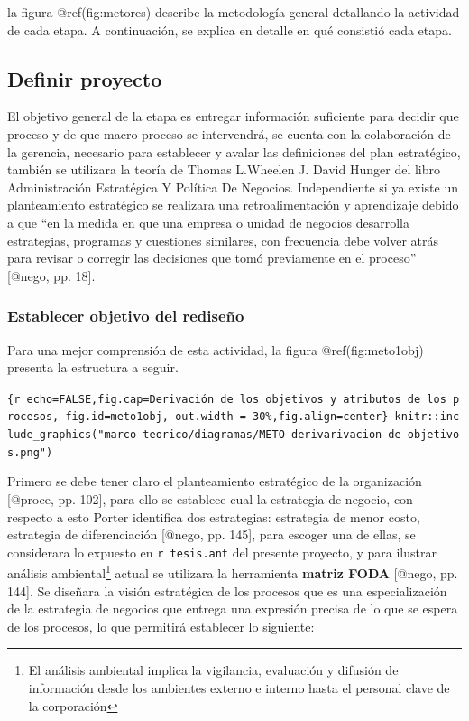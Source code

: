 \documentclass[11pt]{article}
\begin{document}
la figura @ref(fig:metores) describe la metodología general detallando
la actividad de cada etapa. A continuación, se explica en detalle en qué
consistió cada etapa.

\hypertarget{definir-proyecto}{%
\subsection{Definir proyecto}\label{definir-proyecto}}

El objetivo general de la etapa es entregar información suficiente para
decidir que proceso y de que macro proceso se intervendrá, se cuenta con
la colaboración de la gerencia, necesario para establecer y avalar las
definiciones del plan estratégico, también se utilizara la teoría de
Thomas L.Wheelen J. David Hunger del libro Administración Estratégica Y
Política De Negocios. Independiente si ya existe un planteamiento
estratégico se realizara una retroalimentación y aprendizaje debido a
que ``en la medida en que una empresa o unidad de negocios desarrolla
estrategias, programas y cuestiones similares, con frecuencia debe
volver atrás para revisar o corregir las decisiones que tomó previamente
en el proceso'' {[}@nego, pp. 18{]}.

\hypertarget{establecer-objetivo-del-rediseuxf1o}{%
\subsubsection{Establecer objetivo del
rediseño}\label{establecer-objetivo-del-rediseuxf1o}}

Para una mejor comprensión de esta actividad, la figura
@ref(fig:meto1obj) presenta la estructura a seguir.

\texttt{\{r\ echo=FALSE,fig.cap=\textquotesingle{}Derivación\ de\ los\ objetivos\ y\ atributos\ de\ los\ procesos\textquotesingle{},\ fig.id=\textquotesingle{}meto1obj\textquotesingle{},\ out.width\ =\ \textquotesingle{}30\%\textquotesingle{},fig.align=\textquotesingle{}center\textquotesingle{}\}\ knitr::include\_graphics("marco\ teorico/diagramas/METO\ derivarivacion\ de\ objetivos.png")}

Primero se debe tener claro el planteamiento estratégico de la
organización {[}@proce, pp. 102{]}, para ello se establece cual la
estrategia de negocio, con respecto a esto Porter identifica dos
estrategias: estrategia de menor costo, estrategia de diferenciación
{[}@nego, pp. 145{]}, para escoger una de ellas, se considerara lo
expuesto en \texttt{r\ tesis.ant} del presente proyecto, y para ilustrar
análisis ambiental\footnote{El análisis ambiental implica la vigilancia,
  evaluación y difusión de información desde los ambientes externo e
  interno hasta el personal clave de la corporación} actual se utilizara
la herramienta \textbf{matriz FODA} {[}@nego, pp. 144{]}. Se diseñara la
visión estratégica de los procesos que es una especialización de la
estrategia de negocios que entrega una expresión precisa de lo que se
espera de los procesos, lo que permitirá establecer lo siguiente:
\end{document}
